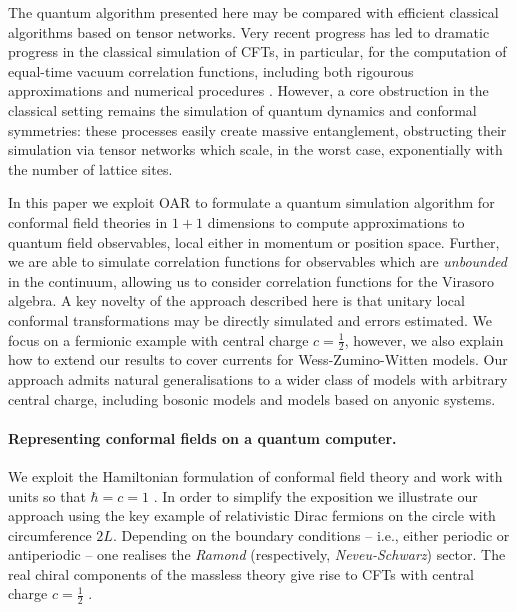 \documentclass[12pt]{article}
\newcommand{\1}{\mathds{1}}
\begin{document}
The quantum algorithm presented here may be compared with efficient classical algorithms based on tensor networks. Very recent progress has led to dramatic progress in the classical simulation of CFTs, in particular, for the computation of equal-time vacuum correlation functions, including both rigourous approximations and numerical procedures \cite{milstedExtractionConformalData2017a,zouConformalFieldsOperator2020,zouEmergenceConformalSymmetry2020,zouConformalDataRenormalization2018a,konigMatrixProductApproximations2017,konigMatrixProductApproximations2016,haegemanRigorousFreeFermionEntanglement2018,singhHolographicConstructionQuantum2016}. However, a core obstruction in the classical setting remains the simulation of quantum dynamics and conformal symmetries: these processes easily create massive entanglement, obstructing their simulation via tensor networks which scale, in the worst case, exponentially with the number of lattice sites. 
 
In this paper we exploit OAR to formulate a quantum simulation algorithm for conformal field theories in $1+1$ dimensions to compute approximations to quantum field observables, local either in momentum or position space. Further, we are able to simulate correlation functions for observables which are \emph{unbounded} in the continuum, allowing us to consider correlation functions for the Virasoro algebra.  A key novelty of the approach described here is that unitary local conformal transformations may be directly simulated and errors estimated. We focus on a fermionic example with central charge $c=\frac12$, however, we also explain how to extend our results to cover currents for Wess-Zumino-Witten models. Our approach admits natural generalisations to a wider class of models with arbitrary central charge, including bosonic models and models based on anyonic systems.  

\paragraph*{Representing conformal fields on a quantum computer.}
We exploit the Hamiltonian formulation of conformal field theory and work with units so that $\hbar = c = 1$ \cite{francescoConformalFieldTheory1997}. In order to simplify the exposition we illustrate our approach using the key example of relativistic Dirac fermions on the circle with circumference $2L$. Depending on the boundary conditions -- i.e., either periodic or antiperiodic -- one realises the \emph{Ramond} (respectively, \emph{Neveu-Schwarz}) sector. The real chiral components of the massless theory give rise to CFTs with central charge $c=\frac12$ \cite{francescoConformalFieldTheory1997}.
\end{document}
